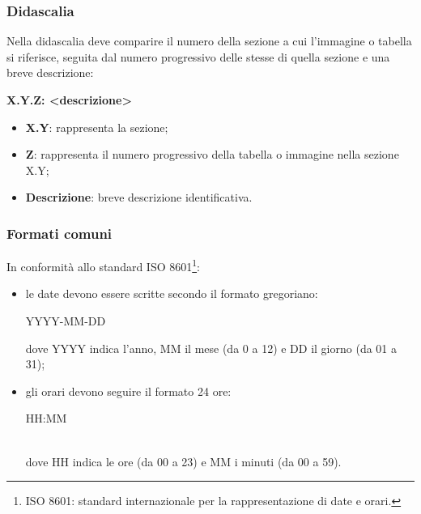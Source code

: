\subsubsection{Didascalia}
Nella didascalia deve comparire il numero della sezione a cui l'immagine o tabella si riferisce, seguita dal numero progressivo delle stesse di quella sezione e una breve descrizione: \\
\centerline{\textbf{X.Y.Z: <descrizione>}}
\begin{itemize}
\item \textbf{X.Y}: rappresenta la sezione;
\item \textbf{Z}: rappresenta il numero progressivo della tabella o immagine nella sezione X.Y;
\item \textbf{Descrizione}: breve descrizione identificativa.
\end{itemize}

\subsubsection{Formati comuni}
In conformità allo standard ISO 8601\footnote{ISO 8601: standard internazionale per la rappresentazione di date e orari.}:\begin{itemize}
\item le date devono essere scritte secondo il formato gregoriano: \\
	\centerline{YYYY-MM-DD}
	dove YYYY indica l'anno, MM il mese (da 0 a 12) e DD il giorno (da 01 a 31);
\item gli orari devono seguire il formato 24 ore: \\
	\centerline{HH:MM} \\
	dove HH indica le ore (da 00 a 23) e MM i minuti (da 00 a 59).
\end{itemize} 


